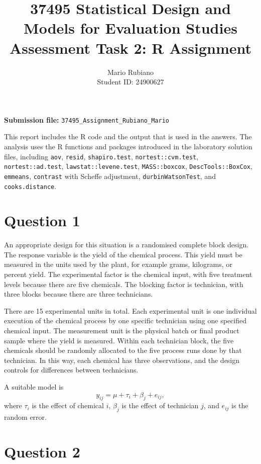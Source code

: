 \documentclass[11pt,a4paper]{article}
\title{37495 Statistical Design and Models for Evaluation Studies\\
Assessment Task 2: R Assignment}
\author{Mario Rubiano\\Student ID: 24900627}
\date{}
\begin{document}
\maketitle

\begin{center}
\textbf{Submission file:} \texttt{37495\_Assignment\_Rubiano\_Mario}
\end{center}

This report includes the R code and the output that is used in the answers. The analysis uses the R functions and packages introduced in the laboratory solution files, including \texttt{aov}, \texttt{resid}, \texttt{shapiro.test}, \texttt{nortest::cvm.test}, \texttt{nortest::ad.test}, \texttt{lawstat::levene.test}, \texttt{MASS::boxcox}, \texttt{DescTools::BoxCox}, \texttt{emmeans}, \texttt{contrast} with Scheffe adjustment, \texttt{durbinWatsonTest}, and \texttt{cooks.distance}.

\section*{Question 1}

An appropriate design for this situation is a randomised complete block design. The response variable is the yield of the chemical process. This yield must be measured in the units used by the plant, for example grams, kilograms, or percent yield. The experimental factor is the chemical input, with five treatment levels because there are five chemicals. The blocking factor is technician, with three blocks because there are three technicians.

There are 15 experimental units in total. Each experimental unit is one individual execution of the chemical process by one specific technician using one specified chemical input. The measurement unit is the physical batch or final product sample where the yield is measured. Within each technician block, the five chemicals should be randomly allocated to the five process runs done by that technician. In this way, each chemical has three observations, and the design controls for differences between technicians.

A suitable model is
\[
y_{ij} = \mu + \tau_i + \beta_j + e_{ij},
\]
where $\tau_i$ is the effect of chemical $i$, $\beta_j$ is the effect of technician $j$, and $e_{ij}$ is the random error.

\section*{Question 2}
\end{document}
